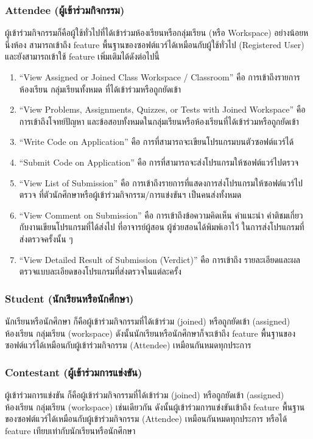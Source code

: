 \documentclass[12pt,one side,openright,a4paper]{cpe-thesis-th}
\newcommand{\thaijustify}[1]{%
  \par\hspace{30pt}\justifying
  #1
}
\begin{document}
\subsubsection{Attendee (ผู้เข้าร่วมกิจกรรม)}
\thaijustify{
  ผู้เข้าร่วมกิจกรรมก็คือผู้ใช้ทั่วไปที่ได้เข้าร่วมห้องเรียนหรือกลุ่มเรียน (หรือ Workspace) อย่างน้อยหนึ่งห้อง สามารถเข้าถึง feature พื้นฐานของซอฟต์แวร์ได้เหมือนกับผู้ใช้ทั่วไป (Registered User) และยังสามารถเข้าใช้ feature เพิ่มเติมได้ดังต่อไปนี้
}
\begin{enumerate}
  \item “View Assigned or Joined Class Workspace / Classroom” คือ การเข้าถึงรายการห้องเรียน กลุ่มเรียนทั้งหมด ที่ได้เข้าร่วมหรือถูกยัดเข้า
  \item “View Problems, Assignments, Quizzes, or Tests with Joined Workspace” คือการเข้าถึงโจทย์ปัญหา และข้อสอบทั้งหมดในกลุ่มเรียนหรือห้องเรียนที่ได้เข้าร่วมหรือถูกยัดเข้า
  \item “Write Code on Application” คือ การที่สามารถจะเขียนโปรแกรมบนตัวซอฟต์แวร์ได้
  \item “Submit Code on Application” คือ การที่สามารถจะส่งโปรแกรมให้ซอฟต์แวร์ไปตรวจ
  \item “View List of Submission” คือ การเข้าถึงรายการที่แสดงการส่งโปรแกรมให้ซอฟต์แวร์ไปตรวจ ที่ตัวนักศึกษาหรือผู้เข้าร่วมกิจกรรม/การแข่งขันฯ เป็นคนส่งทั้งหมด
  \item “View Comment on Submission” คือ การเข้าถึงข้อความคิดเห็น คำแนะนำ คำติชมเกี่ยวกับงานเขียนโปรแกรมที่ได้ส่งไป ที่อาจารย์ผู้สอน ผู้ช่วยสอนได้พิมพ์เอาไว้ ในการส่งโปรแกรมที่ส่งตรวจครั้งนั้น ๆ
  \item “View Detailed Result of Submission (Verdict)” คือ การเข้าถึง รายละเอียดและผลตรวจแบบละเอียดของโปรแกรมที่ส่งตรวจในแต่ละครั้ง
\end{enumerate}
\subsubsection{Student (นักเรียนหรือนักศึกษา)}
\thaijustify{
  นักเรียนหรือนักศึกษา ก็คือผู้เข้าร่วมกิจกรรมที่ได้เข้าร่วม (joined) หรือถูกยัดเข้า (assigned) ห้องเรียน กลุ่มเรียน (workspace) ดังนั้นนักเรียนหรือนักศึกษาก็จะเข้าถึง feature พื้นฐานของซอฟต์แวร์ได้เหมือนกับผู้เข้าร่วมกิจกรรม (Attendee) เหมือนกันหมดทุกประการ
}
\subsubsection{Contestant (ผู้เข้าร่วมการแข่งขัน)}
\thaijustify{
  ผู้เข้าร่วมการแข่งขัน ก็คือผู้เข้าร่วมกิจกรรมที่ได้เข้าร่วม (joined) หรือถูกยัดเข้า (assigned) ห้องเรียน กลุ่มเรียน (workspace) เช่นเดียวกัน ดังนั้นผู้เข้าร่วมการแข่งขันเข้าถึง feature พื้นฐานของซอฟต์แวร์ได้เหมือนกับผู้เข้าร่วมกิจกรรม (Attendee) เหมือนกันหมดทุกประการ หรือได้ feature เทียบเท่ากับนักเรียนหรือนักศึกษา
}
\end{document}
